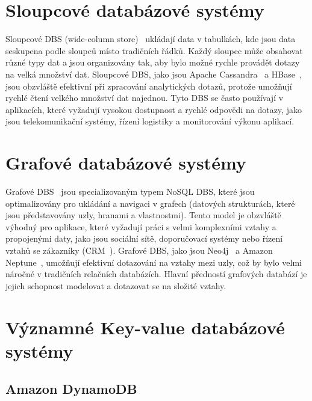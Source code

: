 \documentclass[czech,master,dept460,male,csharp,cpdeclaration]{diploma}
\begin{document}
	\section{Sloupcové databázové systémy}
	
	Sloupcové DBS (wide-column store)~\cite{nosql} ukládají data v tabulkách, kde jsou data seskupena podle sloupců místo tradičních řádků. Každý sloupec může obsahovat různé typy dat a jsou organizovány tak, aby bylo možné rychle provádět dotazy na velká množství dat. Sloupcové DBS, jako jsou Apache Cassandra~\cite{cassandra} a HBase~\cite{hbase}, jsou obzvláště efektivní při zpracování analytických dotazů, protože umožňují rychlé čtení velkého množství dat najednou. Tyto DBS se často používají v aplikacích, které vyžadují vysokou dostupnost a rychlé odpovědi na dotazy, jako jsou telekomunikační systémy, řízení logistiky a monitorování výkonu aplikací.
	
	\section{Grafové databázové systémy}
	
	Grafové DBS~\cite{nosql} jsou specializovaným typem NoSQL DBS, které jsou optimalizovány pro ukládání a navigaci v grafech (datových strukturách, které jsou představovány uzly, hranami a vlastnostmi). Tento model je obzvláště výhodný pro aplikace, které vyžadují práci s velmi komplexními vztahy a propojenými daty, jako jsou sociální sítě, doporučovací systémy nebo řízení vztahů se zákazníky (CRM~\cite{crm}). Grafové DBS, jako jsou Neo4j~\cite{neo4j} a Amazon Neptune~\cite{amazon-neptune}, umožňují efektivní dotazování na vztahy mezi uzly, což by bylo velmi náročné v tradičních relačních databázích. Hlavní předností grafových databází je jejich schopnost modelovat a dotazovat se na složité vztahy.
	
	\section{Významné Key-value databázové systémy}
	
	\subsection{Amazon DynamoDB}
	
\end{document}

